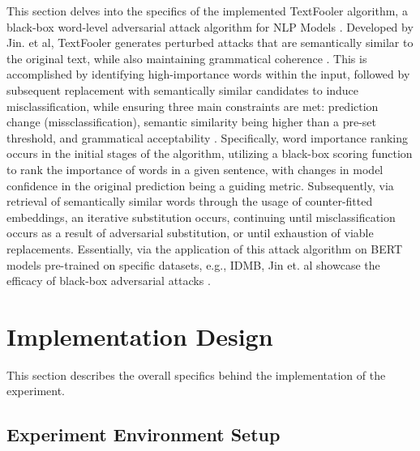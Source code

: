 \documentclass[conference]{IEEEtran}
\begin{document}
This section delves into the specifics of the implemented TextFooler algorithm, a black-box word-level adversarial attack algorithm for NLP Models \cite{jin2020bertrobust}. Developed by Jin. et al, TextFooler generates perturbed attacks that are semantically similar to the original text, while also maintaining grammatical coherence \cite{jin2020bertrobust}. This is accomplished by identifying high-importance words within the input, followed by subsequent replacement with semantically similar candidates to induce misclassification, while ensuring three main constraints are met: prediction change (missclassification), semantic similarity being higher than a pre-set threshold, and grammatical acceptability \cite{jin2020bertrobust} \cite{textattack2020framework}. Specifically, word importance ranking occurs in the initial stages of the algorithm, utilizing a black-box scoring function to rank the importance of words in a given sentence, with changes in model confidence in the original prediction being a guiding metric. Subsequently, via retrieval of semantically similar words through the usage of counter-fitted embeddings, an iterative substitution occurs, continuing until misclassification occurs as a result of adversarial substitution, or until exhaustion of viable replacements. Essentially, via the application of this attack algorithm on BERT models pre-trained on specific datasets, e.g., IDMB, Jin et. al showcase the efficacy of black-box adversarial attacks \cite{jin2020bertrobust, mrksic2016counterfitting}.

\section{Implementation Design}

This section describes the overall specifics behind the implementation of the experiment.

\subsection{Experiment Environment Setup}
\end{document}
